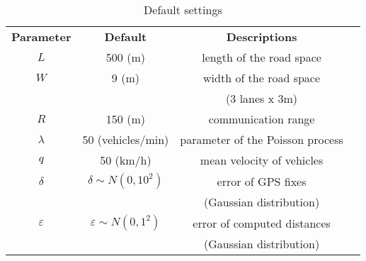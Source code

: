 \documentclass[letterpaper, 10 pt, conference]{ieeeconf}
\begin{document}
\begin {table}
\renewcommand{\arraystretch}{1.3}
\centering \caption{Default settings} \label{table:settings}
\begin{tabular}{|l|l|l|l}
\cline{1-3}
\multicolumn{1}{|c|}{\textbf{Parameter}} & \multicolumn{1}{c|}{\textbf{Default}} & \multicolumn{1}{c|}{\textbf{Descriptions}} &  \\
\cline{1-3}
\multicolumn{1}{|c|}{$L$} & \multicolumn{1}{c|}{500 (m)} & \multicolumn{1}{c|}{length of the road space} &  \\
\cline{1-3}
\multicolumn{1}{|c|}{$W$} & \multicolumn{1}{c|}{9 (m)} & \multicolumn{1}{c|}{width of the road space} &  \\
\multicolumn{1}{|c|}{} & \multicolumn{1}{c|}{} & \multicolumn{1}{c|}{(3 lanes x 3m)} &  \\
\cline{1-3}
\multicolumn{1}{|c|}{$R$} & \multicolumn{1}{c|}{150 (m)} & \multicolumn{1}{c|}{communication range} &  \\
\cline{1-3}
\multicolumn{1}{|c|}{$\lambda$} & \multicolumn{1}{c|}{50 (vehicles/min)} & \multicolumn{1}{c|}{parameter of the Poisson process} &  \\
\cline{1-3}
\multicolumn{1}{|c|}{$q$} & \multicolumn{1}{c|}{50 (km/h)} & \multicolumn{1}{c|}{mean velocity of vehicles} &  \\
\cline{1-3}
\multicolumn{1}{|c|}{$\delta$} & \multicolumn{1}{c|}{$\delta  \sim N(0,10^2 )$} & \multicolumn{1}{c|}{error of GPS fixes} &  \\
\multicolumn{1}{|c|}{} & \multicolumn{1}{c|}{} & \multicolumn{1}{c|}{(Gaussian distribution)} &  \\
\cline{1-3}
\multicolumn{1}{|c|}{$\varepsilon$} & \multicolumn{1}{c|}{$\varepsilon  \sim N(0,1^2 )$} & \multicolumn{1}{c|}{error of computed distances} &  \\
\multicolumn{1}{|c|}{} & \multicolumn{1}{c|}{} & \multicolumn{1}{c|}{(Gaussian distribution)} &  \\
\cline{1-3}
\end{tabular}
\end{table}
\end{document}
